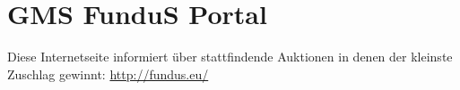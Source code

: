 \section{GMS FunduS Portal}
Diese Internetseite informiert über stattfindende Auktionen in denen der kleinste Zuschlag gewinnt: 
\href{http://fundus.eu/}{http://fundus.eu/}
